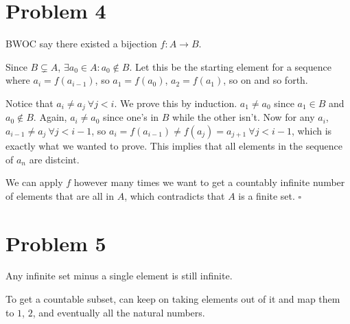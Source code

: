 \documentclass[12pt]{article}
\begin{document}
\section{Problem 4}

BWOC say there existed a bijection $f: A \to B$.

Since $B \subsetneq A$, $\exists a_0 \in A: a_0 \notin B$.
Let this be the starting element for a sequence where $a_i=f(a_{i-1})$,
so $a_1=f(a_0)$, $a_2=f(a_1)$, so on and so forth.

Notice that $a_i \ne a_j\ \forall j < i$.
We prove this by induction.
$a_1 \ne a_0$ since $a_1 \in B$ and $a_0 \notin B$.
Again, $a_i \ne a_0$ since one's in $B$ while the other isn't.
Now for any $a_i$, $a_{i-1} \ne a_j\ \forall j < i-1$,
so $a_i=f(a_{i-1}) \ne f(a_j)=a_{j+1}\ \forall j < i-1$,
which is exactly what we wanted to prove.
This implies that all elements in the sequence of $a_n$ are distcint.

We can apply $f$ however many times we want to get a countably
infinite number of elements that are all in $A$,
which contradicts that $A$ is a finite set. $\square$

\section{Problem 5}

Any infinite set minus a single element is still infinite.

To get a countable subset, can keep on taking elements out of it
and map them to $1$, $2$, and eventually all the natural numbers.
\end{document}

